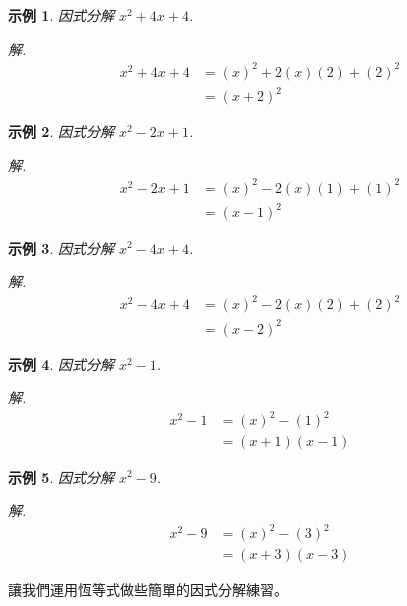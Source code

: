 \documentclass[12pt]{article}
\newtheorem{example}{示例}
\begin{document}
    \begin{example}
        因式分解 $x^2+4x+4$.
    \end{example}
    \textit{ 解. }\begin{align*}
        x^2+4x+4&=(x)^2+2(x)(2)+(2)^2\\
        &=(x+2)^2
    \end{align*}

    \begin{example}
        因式分解 $x^2-2x+1$.
    \end{example}
    \textit{ 解. }\begin{align*}
        x^2-2x+1&=(x)^2-2(x)(1)+(1)^2\\
        &=(x-1)^2
    \end{align*}

    \begin{example}
        因式分解 $x^2-4x+4$.
    \end{example}
    \textit{ 解. }\begin{align*}
        x^2-4x+4&=(x)^2-2(x)(2)+(2)^2\\
        &=(x-2)^2
    \end{align*}

    \begin{example}
        因式分解 $x^2-1$.
    \end{example}
    \textit{ 解. }\begin{align*}
        x^2-1&=(x)^2-(1)^2\\
        &=(x+1)(x-1)
    \end{align*}

    \begin{example}
        因式分解 $x^2-9$.
    \end{example}
    \textit{ 解. }\begin{align*}
        x^2-9&=(x)^2-(3)^2\\
        &=(x+3)(x-3)
    \end{align*}

    讓我們運用恆等式做些簡單的因式分解練習。
\end{document}
